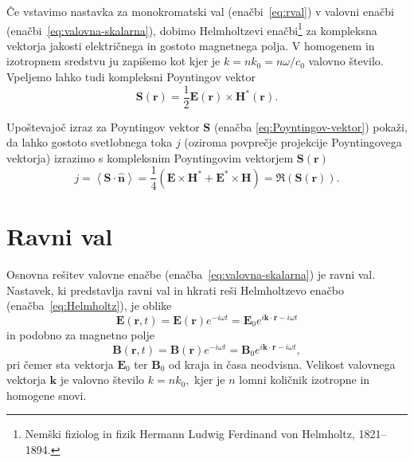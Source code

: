 Če vstavimo nastavka za monokromatski val (enačbi~\ref{eq:rval}) v valovni enačbi
(enačbi~\ref{eq:valovna-skalarna}), dobimo Helmholtzevi
enačbi\footnote{Nemški fiziolog in fizik Hermann Ludwig Ferdinand von Helmholtz, 1821--1894.} 
za kompleksna vektorja jakosti električnega in gostoto magnetnega polja.
V homogenem in izotropnem sredstvu ju zapišemo kot
kjer je $k=nk_{0}=n\omega/c_{0}$ valovno število. 
Vpeljemo lahko tudi kompleksni Poyntingov vektor
\begin{equation}
\mathbf{S}(\mathbf{r})=\frac{1}{2}\mathbf{E}(\mathbf{r})\times\mathbf{H}^{*}(\mathbf{r}).
\label{eq:Poyntingov-vektor-c}
\end{equation}
\begin{definition}
Upoštevajoč izraz za Poyntingov vektor $\mathbf{S}$
(enačba \ref{eq:Poyntingov-vektor}) pokaži, da lahko gostoto svetlobnega toka $j$
(oziroma povprečje projekcije Poyntingovega vektorja)
 izrazimo
s kompleksnim Poyntingovim vektorjem $\mathbf{S}(\mathbf{r})$
\begin{equation}
\label{eq:jReS}
j=\left\langle \mathbf{\mathbf{S}}\cdot\mathbf{\hat{n}}\right\rangle =
\frac{1}{4}\left(\mathbf{E}\times\mathbf{H}^{*}+\mathbf{E}^{*}\times\mathbf{H}\right)=\Re(\mathbf{S}
(\mathbf{r})).
\end{equation}
\end{definition}

\section{Ravni val}
Osnovna rešitev valovne enačbe (enačba~\ref{eq:valovna-skalarna}) je ravni 
val. Nastavek, ki predstavlja ravni val in hkrati reši 
Helmholtzevo enačbo (enačba~\ref{eq:Helmholtz}), je oblike
\begin{equation}
\mathbf{E}(\mathbf{r},t)  =\mathbf{E}(\mathbf{r})e^{-i\omega t}=
\mathbf{E}_{0}e^{i\mathbf{k}\cdot\mathbf{r}-i \omega t}
\end{equation}
in podobno za magnetno polje
\begin{equation}
 \mathbf{B}(\mathbf{r},t)  =\mathbf{B}(\mathbf{r})e^{-i\omega t}=
\mathbf{B}_{0}e^{i\mathbf{k}\cdot\mathbf{r}-i \omega t},
\end{equation}
pri čemer sta vektorja $\mathbf{E}_{0}$ ter $\mathbf{B}_{0}$ od kraja in časa neodvisna. 
Velikost valovnega vektorja $\mathbf{k}$ je valovno število $k=nk_{0},$ 
kjer je $n$ lomni količnik izotropne in homogene snovi. 

